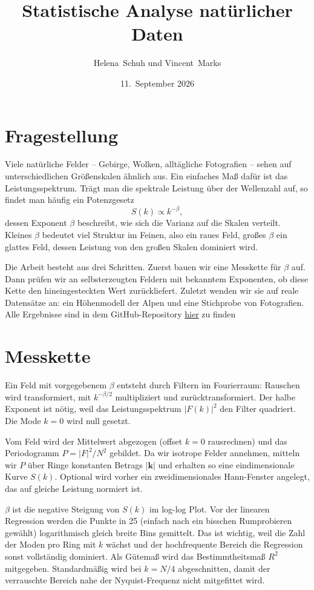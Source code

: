 \documentclass[]{scrartcl}
\title{Statistische Analyse natürlicher Daten}
\author{Helena~Schuh und Vincent~Marks}
\date{11.~September 2026}
\numberwithin{equation}{section}
\begin{document}
\maketitle

\section{Fragestellung}

Viele natürliche Felder -- Gebirge, Wolken, alltägliche Fotografien -- sehen auf
unterschiedlichen Größenskalen ähnlich aus. Ein einfaches Maß dafür ist das
Leistungsspektrum. Trägt man die spektrale Leistung über der Wellenzahl auf, so
findet man häufig ein Potenzgesetz
%
\begin{equation}\label{eq:powerlaw}
  S(k) \propto k^{-\beta},
\end{equation}
%
dessen Exponent $\beta$ beschreibt, wie sich die Varianz auf die Skalen
verteilt. Kleines $\beta$ bedeutet viel Struktur im Feinen, also ein raues Feld,
großes $\beta$ ein glattes Feld, dessen Leistung von den großen Skalen dominiert
wird.

Die Arbeit besteht aus drei Schritten. Zuerst bauen wir eine Messkette für
$\beta$ auf. Dann prüfen wir an selbsterzeugten Feldern mit
bekanntem Exponenten, ob diese Kette den hineingesteckten Wert
zurückliefert. Zuletzt wenden wir sie auf reale
Datensätze an: ein Höhenmodell der Alpen und eine Stichprobe
von Fotografien. Alle Ergebnisse sind in dem GitHub-Repository \href{https://github.com/vincmarks/mod_fractals}{hier} zu finden

\section{Messkette}

Ein Feld mit vorgegebenem $\beta$ entsteht durch Filtern im Fourierraum:
Rauschen wird transformiert, mit $k^{-\beta/2}$ multipliziert und
zurücktransformiert. Der halbe Exponent ist nötig, weil das Leistungsspektrum
$\lvert F(k)\rvert^{2}$ den Filter quadriert. Die Mode $k = 0$ wird null gesetzt.
\par
Vom Feld wird der Mittelwert abgezogen (offset $k=0$ rausrechnen) und das Periodogramm
$P = \lvert F \rvert^{2}/N^{2}$ gebildet. Da wir isotrope Felder annehmen,
mitteln wir $P$ über Ringe konstanten Betrags $\lvert \mathbf{k}\rvert$ und
erhalten so eine eindimensionale Kurve $S(k)$. Optional wird vorher ein
zweidimensionales Hann-Fenster angelegt, das auf gleiche Leistung normiert ist.
\par
$\beta$ ist die negative Steigung von $S(k)$ im log-log Plot. 
Vor der linearen Regression werden die Punkte in 25 (einfach nach ein bisschen Rumprobieren gewählt) 
logarithmisch gleich breite Bins gemittelt. Das ist wichtig, weil die Zahl der Moden pro
Ring mit $k$ wächst und der hochfrequente Bereich die Regression sonst
vollständig dominiert. Als Gütemaß wird das Bestimmtheitsmaß $R^{2}$
mitgegeben. Standardmäßig wird bei $k = N/4$ abgeschnitten, damit der
verrauschte Bereich nahe der Nyquist-Frequenz nicht mitgefittet wird.
\end{document}
